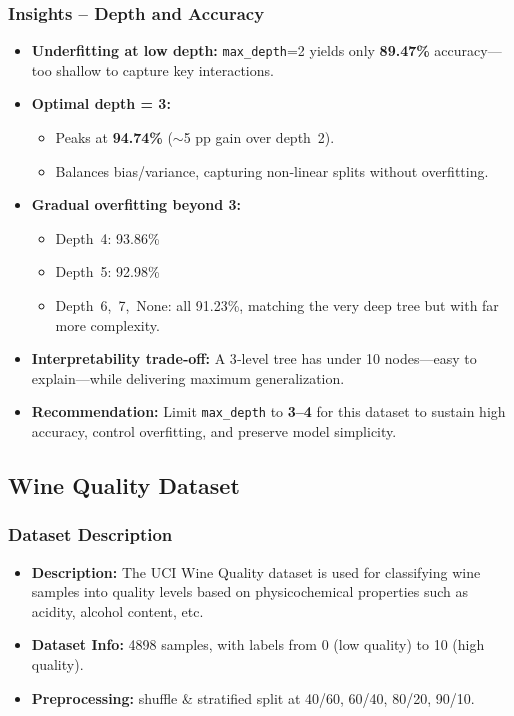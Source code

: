 \subsubsection*{Insights – Depth and Accuracy}
\begin{itemize}
	\item \textbf{Underfitting at low depth:}
	      \texttt{max\_depth}=2 yields only \textbf{89.47\%} accuracy—too shallow to capture key interactions.
	\item \textbf{Optimal depth = 3:}
	      \begin{itemize}
		      \item Peaks at \textbf{94.74\%} ($\sim$5 pp gain over depth 2).
		      \item Balances bias/variance, capturing non‑linear splits without overfitting.
	      \end{itemize}
	\item \textbf{Gradual overfitting beyond 3:}
	      \begin{itemize}
		      \item Depth 4: 93.86\%
		      \item Depth 5: 92.98\%
		      \item Depth 6, 7, None: all 91.23\%, matching the very deep tree but with far more complexity.
	      \end{itemize}
	\item \textbf{Interpretability trade‑off:}
	      A 3‑level tree has under 10 nodes—easy to explain—while delivering maximum generalization.
	\item \textbf{Recommendation:}
	      Limit \texttt{max\_depth} to \textbf{3–4} for this dataset to sustain high accuracy, control overfitting, and preserve model simplicity.
\end{itemize}

\clearpage
\subsection{Wine Quality Dataset}
\subsubsection*{Dataset Description}
\begin{itemize}
	\item \textbf{Description:} The UCI Wine Quality dataset is used for classifying wine samples into quality levels based on physicochemical properties such as acidity, alcohol content, etc.
	\item \textbf{Dataset Info:} 4898 samples, with labels from 0 (low quality) to 10 (high quality).
	\item \textbf{Preprocessing:} shuffle \& stratified split at 40/60, 60/40, 80/20, 90/10.
\end{itemize}

